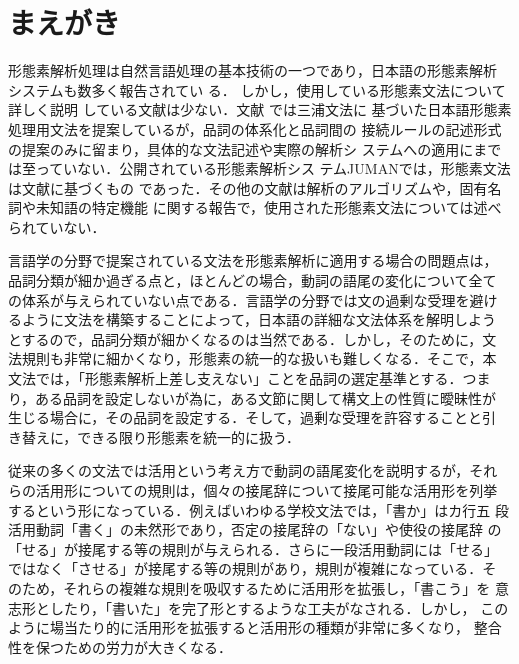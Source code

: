 \section{まえがき}
形態素解析処理は自然言語処理の基本技術の一つであり，日本語の形態素解析
システムも数多く報告されてい
る\cite{yosimura83}\cite{hisamitu90}\cite{nakamura}\cite{miyazaki}\cite{kitani}\cite{hisamitu94a}\cite{maruyama94}\cite{juman}\cite{nagata}．
しかし，使用している形態素文法について詳しく説明
している文献は少ない．文献\cite{miyazaki} では三浦文法\cite{miura}に
基づいた日本語形態素処理用文法を提案しているが，品詞の体系化と品詞間の
接続ルールの記述形式の提案のみに留まり，具体的な文法記述や実際の解析シ
ステムへの適用にまでは至っていない．公開されている形態素解析シス
テムJUMAN\cite{juman}では，形態素文法は文献\cite{masuoka}に基づくもの
であった．その他の文献は解析のアルゴリズムや，固有名詞や未知語の特定機能
に関する報告で，使用された形態素文法については述べられていない．

言語学の分野で提案されている文法を形態素解析に適用する場合の問題点は，
品詞分類が細か過ぎる点と，ほとんどの場合，動詞の語尾の変化について全て
の体系が与えられていない点である．言語学の分野では文の過剰な受理を避け
るように文法を構築することによって，日本語の詳細な文法体系を解明しよう
とするので，品詞分類が細かくなるのは当然である．しかし，そのために，文
法規則も非常に細かくなり，形態素の統一的な扱いも難しくなる．そこで，本
文法では，「形態素解析上差し支えない」ことを品詞の選定基準とする．つま
り，ある品詞を設定しないが為に，ある文節に関して構文上の性質に曖昧性が
生じる場合に，その品詞を設定する．そして，過剰な受理を許容することと引
き替えに，できる限り形態素を統一的に扱う．

従来の多くの文法では活用という考え方で動詞の語尾変化を説明するが，それ
らの活用形についての規則は，個々の接尾辞について接尾可能な活用形を列挙
するという形になっている．例えばいわゆる学校文法では，「書か」はカ行五
段活用動詞「書く」の未然形であり，否定の接尾辞の「ない」や使役の接尾辞
の「せる」が接尾する等の規則が与えられる．さらに一段活用動詞には「せる」
ではなく「させる」が接尾する等の規則があり，規則が複雑になっている．そ
のため，それらの複雑な規則を吸収するために活用形を拡張し，「書こう」を
意志形としたり，「書いた」を完了形とするような工夫がなされる．しかし，
このように場当たり的に活用形を拡張すると活用形の種類が非常に多くなり，
整合性を保つための労力が大きくなる．

